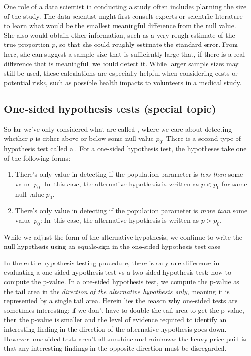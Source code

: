 
One role of a data scientist in conducting a study often
includes planning the size of the study.
The data scientist might first consult experts or scientific
literature to learn what would be the smallest meaningful
difference from the null value.
She also would obtain other information,
such as a very rough estimate of the true proportion $p$,
so that she could roughly estimate the standard error.
From here, she can suggest a sample size that is sufficiently
large that, if there is a real difference that is meaningful,
we could detect it.
While larger sample sizes may still be used,
these calculations are especially helpful when considering
costs or potential risks, such as possible health impacts
to volunteers in a medical study.


\subsection{One-sided hypothesis tests (special topic)}

So far we've only considered what are called , where we care about detecting whether $p$
is either above or below some null value $p_0$.
There is a second type of hypothesis test called a
.
For a one-sided hypothesis test,
the hypotheses take one of the following forms:
\begin{enumerate}
\item There's only value in detecting if the population
    parameter is \emph{less than} some value~$p_0$.
    In~this case, the alternative hypothesis is written
    as $p < p_0$ for some null value $p_0$.
\item There's only value in detecting if the population
    parameter is \emph{more than} some value~$p_0$:
    In~this case, the alternative hypothesis is written
    as $p > p_0$.
\end{enumerate}
While we adjust the form of the alternative hypothesis,
we continue to write the null hypothesis using an equals-sign
in the one-sided hypothesis test case.

In the entire hypothesis testing procedure,
there is only one difference in evaluating a one-sided
hypothesis test vs a two-sided hypothesis test:
how to compute the p-value.
In a one-sided hypothesis test, we compute the p-value as
the tail area in the \emph{direction of the alternative
hypothesis only}, meaning it is represented by a single
tail area. Herein lies the reason why one-sided tests
are sometimes interesting: if we don't have to double
the tail area to get the p-value, then the p-value is
smaller and the level of evidence required to identify
an interesting finding in the direction of the
alternative hypothesis goes down.
However, one-sided tests aren't all sunshine and rainbows:
the heavy price paid is that any interesting findings
in the opposite direction must be disregarded.


